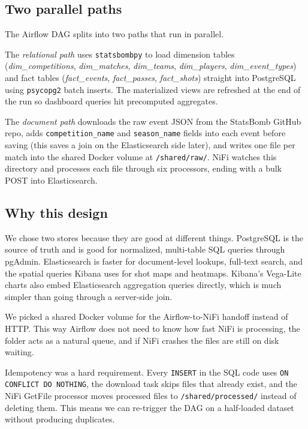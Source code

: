 \documentclass[conference]{IEEEtran}
\begin{document}
\subsection{Two parallel paths}

The Airflow DAG splits into two paths that run in parallel.

The \textit{relational path} uses \texttt{statsbombpy} \cite{statsbombpy} to
load dimension tables (\textit{dim\_competitions}, \textit{dim\_matches},
\textit{dim\_teams}, \textit{dim\_players}, \textit{dim\_event\_types}) and
fact tables (\textit{fact\_events}, \textit{fact\_passes}, \textit{fact\_shots})
straight into PostgreSQL using \texttt{psycopg2} batch inserts. The materialized
views are refreshed at the end of the run so dashboard queries hit precomputed
aggregates.

The \textit{document path} downloads the raw event JSON from the StatsBomb
GitHub repo, adds \texttt{competition\_name} and \texttt{season\_name} fields
into each event before saving (this saves a join on the Elasticsearch side
later), and writes one file per match into the shared Docker volume at
\texttt{/shared/raw/}. NiFi watches this directory and processes each file
through six processors, ending with a bulk POST into Elasticsearch.

\subsection{Why this design}

We chose two stores because they are good at different things. PostgreSQL is
the source of truth and is good for normalized, multi-table SQL queries through
pgAdmin. Elasticsearch is faster for document-level lookups, full-text search,
and the spatial queries Kibana uses for shot maps and heatmaps. Kibana's
Vega-Lite charts also embed Elasticsearch aggregation queries directly, which
is much simpler than going through a server-side join.

We picked a shared Docker volume for the Airflow-to-NiFi handoff instead of
HTTP. This way Airflow does not need to know how fast NiFi is processing, the
folder acts as a natural queue, and if NiFi crashes the files are still on disk
waiting.

Idempotency was a hard requirement. Every \texttt{INSERT} in the SQL code uses
\texttt{ON CONFLICT DO NOTHING}, the download task skips files that already
exist, and the NiFi GetFile processor moves processed files to
\texttt{/shared/processed/} instead of deleting them. This means we can
re-trigger the DAG on a half-loaded dataset without producing duplicates.
\end{document}
